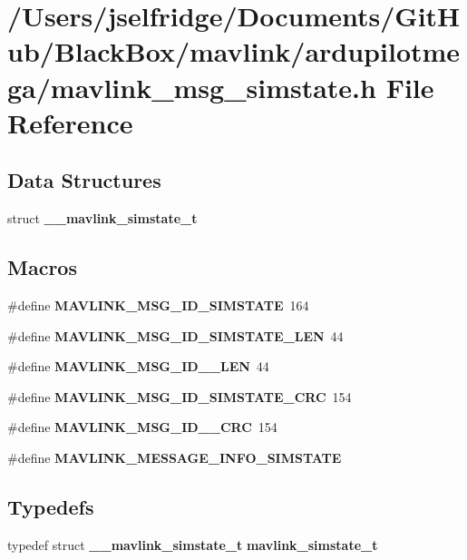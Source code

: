 \section{/\+Users/jselfridge/\+Documents/\+Git\+Hub/\+Black\+Box/mavlink/ardupilotmega/mavlink\+\_\+msg\+\_\+simstate.h File Reference}
\label{mavlink__msg__simstate_8h}
\subsection*{Data Structures}
\begin{DoxyCompactItemize}
\item 
struct \textbf{ \+\_\+\+\_\+mavlink\+\_\+simstate\+\_\+t}
\end{DoxyCompactItemize}
\subsection*{Macros}
\begin{DoxyCompactItemize}
\item 
\#define \textbf{ M\+A\+V\+L\+I\+N\+K\+\_\+\+M\+S\+G\+\_\+\+I\+D\+\_\+\+S\+I\+M\+S\+T\+A\+TE}~164
\item 
\#define \textbf{ M\+A\+V\+L\+I\+N\+K\+\_\+\+M\+S\+G\+\_\+\+I\+D\+\_\+\+S\+I\+M\+S\+T\+A\+T\+E\+\_\+\+L\+EN}~44
\item 
\#define \textbf{ M\+A\+V\+L\+I\+N\+K\+\_\+\+M\+S\+G\+\_\+\+I\+D\+\_\+\_\+\+L\+EN}~44
\item 
\#define \textbf{ M\+A\+V\+L\+I\+N\+K\+\_\+\+M\+S\+G\+\_\+\+I\+D\+\_\+\+S\+I\+M\+S\+T\+A\+T\+E\+\_\+\+C\+RC}~154
\item 
\#define \textbf{ M\+A\+V\+L\+I\+N\+K\+\_\+\+M\+S\+G\+\_\+\+I\+D\+\_\+\_\+\+C\+RC}~154
\item 
\#define \textbf{ M\+A\+V\+L\+I\+N\+K\+\_\+\+M\+E\+S\+S\+A\+G\+E\+\_\+\+I\+N\+F\+O\+\_\+\+S\+I\+M\+S\+T\+A\+TE}
\end{DoxyCompactItemize}
\subsection*{Typedefs}
\begin{DoxyCompactItemize}
\item 
typedef struct \textbf{ \+\_\+\+\_\+mavlink\+\_\+simstate\+\_\+t} \textbf{ mavlink\+\_\+simstate\+\_\+t}
\end{DoxyCompactItemize}


